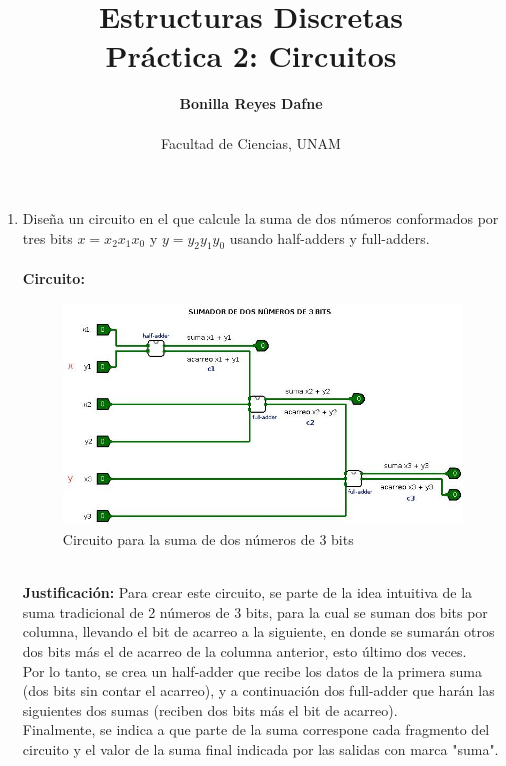 \documentclass[12pt]{article} %
\title{\textbf{Estructuras Discretas} \\
    {Práctica 2: Circuitos}}
\author{\textbf{Bonilla Reyes Dafne} \\ \\
    Facultad de Ciencias, UNAM}
\date{}
\begin{document}
\maketitle
    \begin{enumerate}

        \item Diseña un circuito en el que calcule la suma de dos números 
            conformados por tres bits $x = x_2 x_1 x_0$ y $y = y_2 y_1 y_0$
            usando half-adders y full-adders.
            \\
            \\ 
            \textbf{Circuito:}
            \begin{figure}[h!]
                \centering 
                \includegraphics[scale=0.6]{ejercicio1.jpg}
                \caption{Circuito para la suma de dos números de 3 bits}
            \end{figure}
            \\
            \textbf{Justificación:} 
            Para crear este circuito, se parte de la idea intuitiva de 
            la suma tradicional de 2 números de 3 bits, para la cual se 
            suman dos bits por columna, llevando el bit de acarreo a 
            la siguiente, en donde se sumarán otros dos bits más el 
            de acarreo de la columna anterior, esto último dos veces. \\
            Por lo tanto, se crea un half-adder que recibe los datos de la 
            primera suma (dos bits sin contar el acarreo), y a continuación 
            dos full-adder que harán las siguientes dos sumas (reciben dos 
            bits más el bit de acarreo).\\
            Finalmente, se indica a que parte de la suma correspone cada 
            fragmento del circuito y el valor de la suma final indicada por
            las salidas con marca "suma".
            \\


\end{enumerate}
\end{document}
